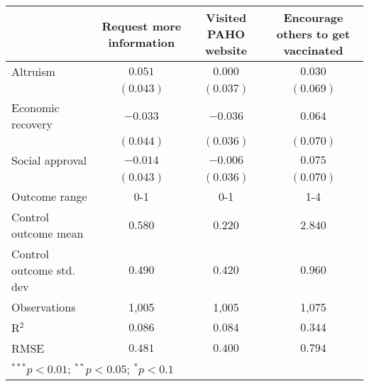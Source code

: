 \begin{table}
\begin{center}
\begin{tabular}{l c c c}
\hline
 & Request more information & Visited PAHO website & Encourage others to get vaccinated \\
\hline
Altruism                 & $0.051$   & $0.000$   & $0.030$   \\
                         & $(0.043)$ & $(0.037)$ & $(0.069)$ \\
Economic recovery        & $-0.033$  & $-0.036$  & $0.064$   \\
                         & $(0.044)$ & $(0.036)$ & $(0.070)$ \\
Social approval          & $-0.014$  & $-0.006$  & $0.075$   \\
                         & $(0.043)$ & $(0.036)$ & $(0.070)$ \\
\hline
Outcome range            & 0-1       & 0-1       & 1-4       \\
Control outcome mean     & $0.580$   & $0.220$   & $2.840$   \\
Control outcome std. dev & $0.490$   & $0.420$   & $0.960$   \\
Observations             & 1,005     & 1,005     & 1,075     \\
R$^{2}$                  & $0.086$   & $0.084$   & $0.344$   \\
RMSE                     & $0.481$   & $0.400$   & $0.794$   \\
\hline
\multicolumn{4}{l}{\scriptsize{$^{***}p<0.01$; $^{**}p<0.05$; $^{*}p<0.1$}}
\end{tabular}
\caption{}
\label{table:Tables and Figures/SI_table23_motiv_Mexico_behav}
\end{center}
\end{table}
